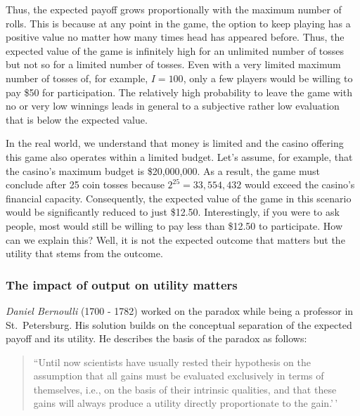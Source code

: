 \documentclass[
  12pt,
  oneside]{book}
\theoremstyle{definition}
\theoremstyle{definition}
\theoremstyle{definition}
\theoremstyle{definition}
\theoremstyle{remark}
\begin{document}
Thus, the expected payoff grows proportionally with the maximum number of rolls. This is because at any point in the game, the option to keep playing has a positive value no matter how many times head has appeared before.
Thus, the expected value of the game is infinitely high for an unlimited number of tosses but not so for a limited number of tosses. Even with a very limited maximum number of tosses of, for example, \(I = 100\), only a few players would be willing to pay
\$50 for participation. The relatively high probability to leave the game with no or very low winnings leads in general to a subjective rather low evaluation that is below the expected value.

In the real world, we understand that money is limited and the casino offering this game also operates within a limited budget.
Let's assume, for example, that the casino's maximum budget is \$20,000,000. As a result, the game must conclude after 25 coin tosses because \(2^{25} = 33,554,432\) would exceed the casino's financial capacity. Consequently, the expected value of the game in this scenario would be significantly reduced to just \$12.50.
Interestingly, if you were to ask people, most would still be willing to pay less than \$12.50 to participate. How can we explain this? Well, it is not the expected outcome that matters but the utility that stems from the outcome.

\subsubsection{The impact of output on utility matters}\label{the-impact-of-output-on-utility-matters}

\emph{Daniel Bernoulli} (1700 - 1782) worked on the paradox while being a professor in St.~Petersburg. His solution builds on the conceptual separation of the expected payoff and its utility. He describes the basis of the paradox as follows:

\begin{quote}
``Until now scientists have usually rested their hypothesis on the assumption that all gains must be evaluated exclusively in terms of themselves, i.e., on the basis of their intrinsic qualities, and that these gains will always produce a utility directly proportionate to the gain.'\,' \citep[p.~27]{Bernoulli1954Exposition}
\end{quote}
\end{document}
